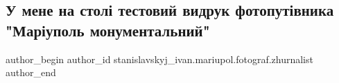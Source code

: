  
 
 
 
 

\subsection{У мене на столі тестовий видрук фотопутівника "Маріуполь монументальний"}
\label{sec:29_08_2022.fb.stanislavskyj_ivan.mariupol.fotograf.zhurnalist.1.u_mene_na_stol__test}

\ifcmt
 author_begin
   author_id stanislavskyj_ivan.mariupol.fotograf.zhurnalist
 author_end
\fi

